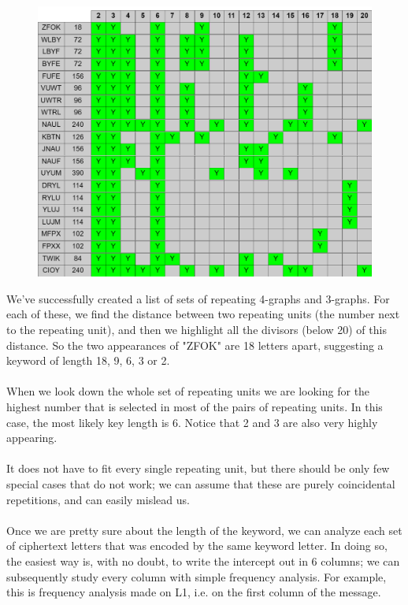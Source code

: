 \documentclass[Lau,binding=0.6cm,oneside]{sapthesis}
\begin{document}
\begin{figure}[H]
\includegraphics[scale=0.53]{repeating_strings}
\centering
\caption{}
\centering
\end{figure}

We've successfully created a list of sets of repeating 4-graphs and 3-graphs. For each of these, we find the distance between two repeating units (the number next to the repeating unit), and then we highlight all the divisors (below 20) of this distance. So the two appearances of "ZFOK" are 18 letters apart, suggesting a keyword of length 18, 9, 6, 3 or 2.\\\\
When we look down the whole set of repeating units we are looking for the highest number that is selected in most of the pairs of repeating units. In this case, the most likely key length is 6. Notice that 2 and 3 are also very highly appearing.\\\\
It does not have to fit every single repeating unit, but there should be only few special cases that do not work; we can assume that these are purely coincidental repetitions, and can easily mislead us.\\\\

Once we are pretty sure about the length of the keyword, we can analyze each set of ciphertext letters that was encoded by the same keyword letter. In doing so, the easiest way is, with no doubt, to write the intercept out in 6 columns; we can subsequently study every column with simple frequency analysis. For example, this is frequency analysis made on L1, i.e. on the first column of the message.
\end{document}
